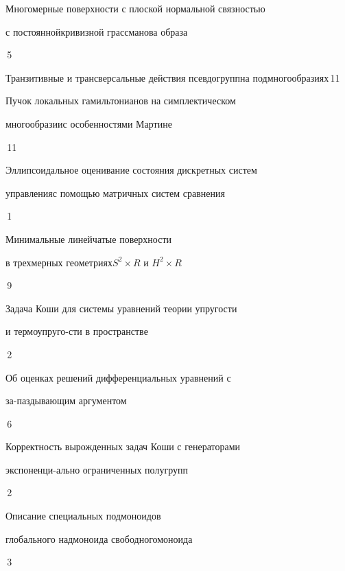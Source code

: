 

{Многомерные поверхности с плоской нормальной связностью


с постоянной\newline кривизной грассманова образа}{\No\,5}




{Транзитивные и  трансверсальные действия псевдогрупп\newline на подмногообразиях}{\No\,11}










{Пучок локальных гамильтонианов на симплектическом


многообразии\newline с особенностями Мартине}{\No\,11}




{Эллипсоидальное оценивание состояния дискретных систем


управления\newline с помощью матричных систем сравнения}{\No\,1}




{Минимальные линейчатые  поверхности


в трехмерных геометриях\newline $S^2 \times R$ и $H^2 \times R$}{\No\,9}




{Задача Коши для системы уравнений теории упругости


и термоупруго-\newline сти в пространстве}{\No\,2}




{Об оценках решений дифференциальных уравнений с


за-\newline паздывающим аргументом}{\No\,6}




{Корректность вырожденных задач Коши с генераторами  


экспоненци-\newline ально ограниченных полугрупп}{\No\,2}




{Описание специальных подмоноидов


глобального надмоноида свободного\newline моноида}{\No\,3}


